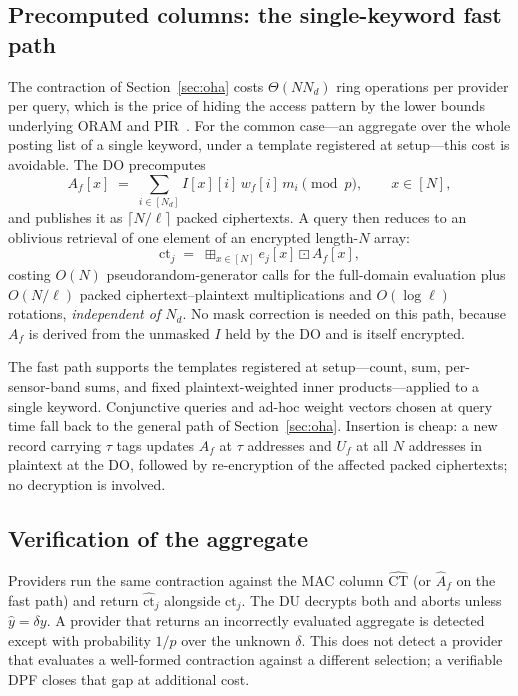 \documentclass[journal]{IEEEtran}
\newcommand{\bplus}{\boxplus}
\newcommand{\bdot}{\boxdot}
\begin{document}
\subsection{Precomputed columns: the single-keyword fast path}
\label{sec:fast}
The contraction of Section~\ref{sec:oha} costs $\Theta(N N_d)$ ring operations per provider per query, which is the price of hiding the access pattern by the lower bounds underlying ORAM and PIR~\cite{goldreich1996software}. For the common case---an aggregate over the whole posting list of a single keyword, under a template registered at setup---this cost is avoidable. The DO precomputes
\[
A_f[x] \;=\; \sum_{i\in[N_d]} I[x][i]\,w_f[i]\,m_i \pmod p, \qquad x\in[N],
\]
and publishes it as $\lceil N/\ell\rceil$ packed ciphertexts. A query then reduces to an oblivious retrieval of one element of an encrypted length-$N$ array:
\[
\text{ct}_j \;=\; \bplus_{x\in[N]} e_j[x]\bdot A_f[x],
\]
costing $O(N)$ pseudorandom-generator calls for the full-domain evaluation plus $O(N/\ell)$ packed ciphertext--plaintext multiplications and $O(\log \ell)$ rotations, \emph{independent of $N_d$}. No mask correction is needed on this path, because $A_f$ is derived from the unmasked $I$ held by the DO and is itself encrypted.

The fast path supports the templates registered at setup---count, sum, per-sensor-band sums, and fixed plaintext-weighted inner products---applied to a single keyword. Conjunctive queries and ad-hoc weight vectors chosen at query time fall back to the general path of Section~\ref{sec:oha}. Insertion is cheap: a new record carrying $\tau$ tags updates $A_f$ at $\tau$ addresses and $U_f$ at all $N$ addresses in plaintext at the DO, followed by re-encryption of the affected packed ciphertexts; no decryption is involved.

\subsection{Verification of the aggregate}
\label{sec:verify}
Providers run the same contraction against the MAC column $\widehat{\text{CT}}$ (or $\widehat{A}_f$ on the fast path) and return $\widehat{\text{ct}}_j$ alongside $\text{ct}_j$. The DU decrypts both and aborts unless $\hat{y}=\delta y$. A provider that returns an incorrectly evaluated aggregate is detected except with probability $1/p$ over the unknown $\delta$. This does not detect a provider that evaluates a well-formed contraction against a different selection; a verifiable DPF closes that gap at additional cost.
\end{document}
